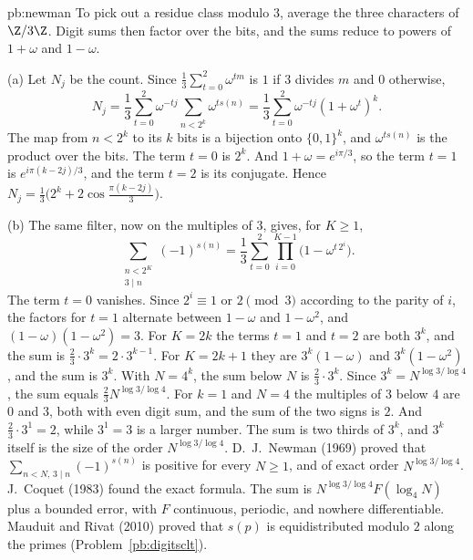 \begin{solution}{pb:newman}
\idea To pick out a residue class modulo $3$, average the three characters of $\Z/3\Z$. Digit sums then factor over the bits, and the sums reduce to powers of $1+\omega$ and $1-\omega$.

\writeup (a) Let $N_j$ be the count. Since $\frac13\sum_{t=0}^2\omega^{tm}$ is $1$ if $3$ divides $m$ and $0$ otherwise,
\[
N_j=\frac13\sum_{t=0}^2\omega^{-tj}\sum_{n<2^k}\omega^{ts(n)}=\frac13\sum_{t=0}^2\omega^{-tj}(1+\omega^t)^k.
\]
The map from $n<2^k$ to its $k$ bits is a bijection onto $\{0,1\}^k$, and $\omega^{ts(n)}$ is the product over the bits. The term $t=0$ is $2^k$. And $1+\omega=e^{i\pi/3}$, so the term $t=1$ is $e^{i\pi(k-2j)/3}$, and the term $t=2$ is its conjugate. Hence $N_j=\frac13\bigl(2^k+2\cos\frac{\pi(k-2j)}3\bigr)$.

(b) The same filter, now on the multiples of $3$, gives, for $K\ge1$,
\[
\sum_{\substack{n<2^K\\3\mid n}}(-1)^{s(n)}=\frac13\sum_{t=0}^2\prod_{i=0}^{K-1}\bigl(1-\omega^{t\,2^i}\bigr).
\]
The term $t=0$ vanishes. Since $2^i\equiv1$ or $2\pmod3$ according to the parity of $i$, the factors for $t=1$ alternate between $1-\omega$ and $1-\omega^2$, and $(1-\omega)(1-\omega^2)=3$. For $K=2k$ the terms $t=1$ and $t=2$ are both $3^k$, and the sum is $\frac23\cdot3^k=2\cdot3^{k-1}$. For $K=2k+1$ they are $3^k(1-\omega)$ and $3^k(1-\omega^2)$, and the sum is $3^k$. With $N=4^k$, the sum below $N$ is $\frac23\cdot3^k$. Since $3^k=N^{\log3/\log4}$, the sum equals $\frac23 N^{\log3/\log4}$. For $k=1$ and $N=4$ the multiples of $3$ below $4$ are $0$ and $3$, both with even digit sum, and the sum of the two signs is $2$. And $\frac23\cdot3^1=2$, while $3^1=3$ is a larger number. The sum is two thirds of $3^k$, and $3^k$ itself is the size of the order $N^{\log3/\log4}$.
\leads D.~J.~Newman (1969) proved that $\sum_{n<N,\,3\mid n}(-1)^{s(n)}$ is positive for every $N\ge1$, and of exact order $N^{\log3/\log4}$. J.~Coquet (1983) found the exact formula. The sum is $N^{\log3/\log4}F(\log_4 N)$ plus a bounded error, with $F$ continuous, periodic, and nowhere differentiable. Mauduit and Rivat (2010) proved that $s(p)$ is equidistributed modulo $2$ along the primes (Problem~\ref{pb:digitsclt}).
\end{solution}


